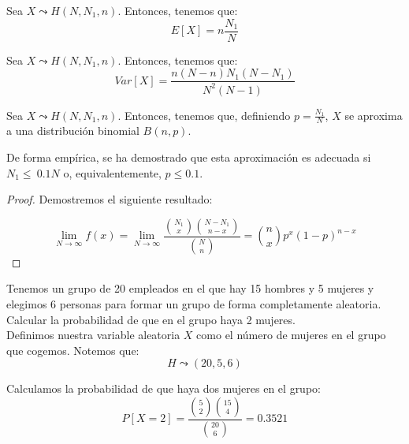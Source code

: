 \begin{prop}
    Sea $X\leadsto H(N,N_1,n)$. Entonces, tenemos que:
    \begin{equation*}
        E[X]= n\frac{N_1}{N}
    \end{equation*}
\end{prop}
\begin{prop}
    Sea $X\leadsto H(N,N_1,n)$. Entonces, tenemos que:
    \begin{equation*}
        Var[X]=\frac{n(N-n)N_1(N-N_1)}{N^2(N-1)}
    \end{equation*}
\end{prop}

\begin{prop}
    Sea $X\leadsto H(N,N_1,n)$. Entonces, tenemos que, definiendo $p=\frac{N_1}{N}$, $X$ se aproxima a una distribución binomial $B(n,p)$.

    De forma empírica, se ha demostrado que esta aproximación es adecuada si $N_1\leq~0.1N$ o, equivalentemente, $p\leq 0.1$.
    
\end{prop}
\begin{proof}

    Demostremos el siguiente resultado:
    
    \begin{equation*}
        \lim_{N\to \infty}f(x) = \lim_{N\to \infty}\frac{\binom{N_1}{x}\binom{N-N_1}{n-x}}{\binom{N}{n}} = \binom{n}{x}p^x(1-p)^{n-x}
    \end{equation*}
\end{proof}

\begin{ejemplo}
    Tenemos un grupo de 20 empleados en el que hay 15 hombres y 5 mujeres y elegimos 6 personas para formar un grupo de forma completamente aleatoria.
    Calcular la probabilidad de que en el grupo haya 2 mujeres.\\
    
    Definimos nuestra variable aleatoria $X$ como el número de mujeres en el grupo que cogemos. Notemos que:
    \begin{equation*}
        H\leadsto (20, 5, 6)
    \end{equation*}
    
    Calculamos la probabilidad de que haya dos mujeres en el grupo:
    \begin{equation*}
        P[X=2]=\frac{\binom{5}{2}\binom{15}{4}}{\binom{20}{6}} = 0.3521
    \end{equation*}
\end{ejemplo}


